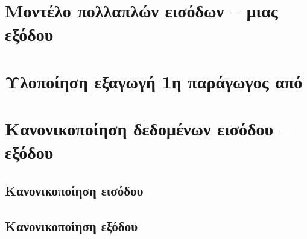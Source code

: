 \section{Μοντέλο πολλαπλών εισόδων -- μιας εξόδου}

\section{Υλοποίηση εξαγωγή  1η παράγωγος από }

\section{Κανονικοποίηση δεδομένων εισόδου -- εξόδου}

\subsection{Κανονικοποίηση εισόδου}

\subsection{Κανονικοποίηση εξόδου}
